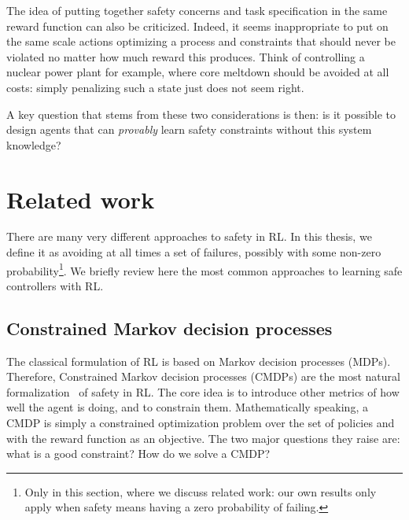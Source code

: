 	The idea of putting together safety concerns and task specification in the same reward function can also be criticized. Indeed, it seems inappropriate to put on the same scale actions optimizing a process and constraints that should never be violated no matter how much reward this produces. Think of controlling a nuclear power plant for example, where core meltdown should be avoided at all costs: simply penalizing such a state just does not seem right.\par
	A key question that stems from these two considerations is then: is it possible to design agents that can\emph{ provably} learn safety constraints without this system knowledge?
	
\section{Related work}
	There are many very different approaches to safety in RL. In this thesis, we define it as avoiding at all times a set of failures, possibly with some non-zero probability\footnote{Only in this section, where we discuss related work: our own results only apply when safety means having a zero probability of failing.}. We briefly review here the most common approaches to learning safe controllers with RL.
	
	\subsection{Constrained Markov decision processes} \label{subsec:CMDPs related work}
		The classical formulation of RL is based on Markov decision processes (MDPs). Therefore, Constrained Markov decision processes (CMDPs) are the most natural formalization~\cite{garcia2015comprehensive} of safety in RL. The core idea is to introduce other metrics of how well the agent is doing, and to constrain them. Mathematically speaking, a CMDP is simply a constrained optimization problem over the set of policies and with the reward function as an objective. The two major questions they raise are: what is a good constraint? How do we solve a CMDP?
		

